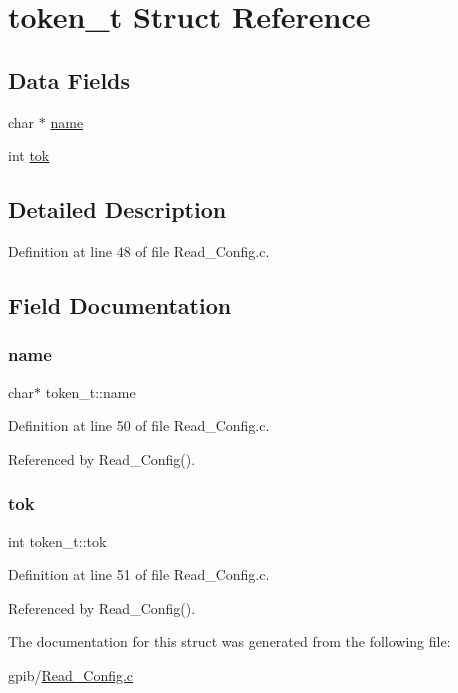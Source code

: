 \hypertarget{structtoken__t}{}\section{token\+\_\+t Struct Reference}
\label{structtoken__t}
\subsection*{Data Fields}
\begin{DoxyCompactItemize}
\item 
char $\ast$ \hyperlink{structtoken__t_a6280ddf4c14a5d6079686deb5f415dfb}{name}
\item 
int \hyperlink{structtoken__t_ab6ff2146ea8b1275e249fd0412988215}{tok}
\end{DoxyCompactItemize}


\subsection{Detailed Description}


Definition at line 48 of file Read\+\_\+\+Config.\+c.



\subsection{Field Documentation}
\mbox{\label{structtoken__t_a6280ddf4c14a5d6079686deb5f415dfb}} 
\subsubsection{\texorpdfstring{name}{name}}
{\footnotesize\ttfamily char$\ast$ token\+\_\+t\+::name}



Definition at line 50 of file Read\+\_\+\+Config.\+c.



Referenced by Read\+\_\+\+Config().

\mbox{\label{structtoken__t_ab6ff2146ea8b1275e249fd0412988215}} 
\subsubsection{\texorpdfstring{tok}{tok}}
{\footnotesize\ttfamily int token\+\_\+t\+::tok}



Definition at line 51 of file Read\+\_\+\+Config.\+c.



Referenced by Read\+\_\+\+Config().



The documentation for this struct was generated from the following file\+:\begin{DoxyCompactItemize}
\item 
gpib/\hyperlink{Read__Config_8c}{Read\+\_\+\+Config.\+c}\end{DoxyCompactItemize}
